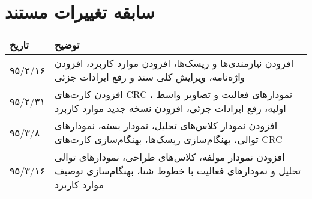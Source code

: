 
\chapter{سابقه تغییرات مستند}

\begin{table}[H]
	\centering
	\begin{tabular}{|p{3cm}|p{5cm}|}
		\hline
		تاریخ & توضیح \\
		\hline
		
		۹۵/۲/۱۶  & افزودن نیازمندی‌ها و ریسک‌ها، افزودن موارد کاربرد، افزودن واژه‌نامه، ویرایش کلی سند و رفع ایرادات جزئی \\
		۹۵/۲/۳۱  & افزودن کارت‌های CRC ، نمودارهای فعالیت و تصاویر واسط اولیه، رفع ایرادات جزئی، افزودن نسخه جدید موارد کاربرد \\
		۹۵/۳/۸  & افزودن نمودار کلاس‌های تحلیل، نمودار بسته، نمودارهای توالی، بهنگام‌سازی ریسک‌ها، بهنگام‌سازی کارت‌های CRC \\
		۹۵/۳/۱۶  & افزودن نمودار مولفه، کلاس‌های طراحی، نمودارهای توالی تحلیل و نمودارهای فعالیت با خطوط شنا، بهنگام‌سازی توصیف موارد کاربرد \\
		
		
		\hline
	\end{tabular}
\end{table}
